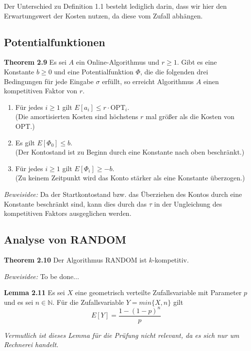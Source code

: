 Der Unterschied zu Definition 1.1 besteht lediglich darin, dass wir hier den Erwartungswert der Kosten nutzen, da diese vom Zufall abhängen.

\subsection{Potentialfunktionen}

\textbf{Theorem 2.9} Es sei $A$ ein Online-Algorithmus und $r \geq 1$. Gibt es eine Konstante $b \geq 0$ und eine Potentialfunktion $\Phi$, die die folgenden drei Bedingungen für jede Eingabe $\sigma$ erfüllt, so erreicht Algorithmus $A$ einen kompetitiven Faktor von $r$.
\begin{enumerate}
\item Für jedes $i \geq 1$ gilt $E[a_i] \leq r \cdot \textrm{OPT}_i$.\\
(Die amortisierten Kosten sind höchstens $r$ mal größer als die Kosten von OPT.)
\item Es gilt $E[\Phi_0] \leq b$.\\
(Der Kontostand ist zu Beginn durch eine Konstante nach oben beschränkt.)
\item Für jedes $i \geq 1$ gilt $E[\Phi_i] \geq -b$.\\
(Zu keinem Zeitpunkt wird das Konto stärker als eine Konstante überzogen.)
\end{enumerate}

\textit{Beweisidee:} Da der Startkontostand bzw. das Überziehen des Kontos durch eine Konstante beschränkt sind, kann dies durch das $\tau$ in der Ungleichung des kompetitiven Faktors ausgeglichen werden.


\subsection{Analyse von RANDOM}


\textbf{Theorem 2.10} Der Algorithmus RANDOM ist $k$-kompetitiv.

\textit{Beweisidee:} To be done...



\textbf{Lemma 2.11} Es sei $X$ eine geometrisch verteilte Zufallsvariable mit Parameter $p$ und es sei $n \in \mathbb{N}$. Für die Zufallsvariable $Y = min\{X,n\}$ gilt $$E[Y] = \frac{1-(1-p)^n}{p}$$

\textit{Vermutlich ist dieses Lemma für die Prüfung nicht relevant, da es sich nur um Rechnerei handelt.}



